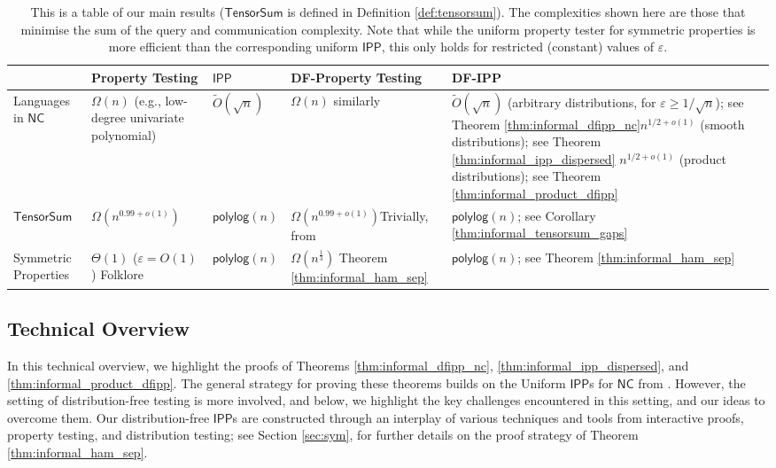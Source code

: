 \documentclass[11pt]{article}
\newcommand{\polylog}{\mathsf{polylog}}
\newcommand{\NC}{\mathsf{NC}}
\newcommand{\IPP}{\mathsf{IPP}}
\newcommand{\TensorSum}{\mathsf{TensorSum}}
\newcommand{\eps}{\varepsilon}
\begin{document}
\begin{table}[!h]
\begin{tabular}{ | m{5em} | m{2.75cm}| m{1.75cm} | m{2.25cm}| m{5.5cm} | } 
  \hline
  & Property \quad Testing & $\IPP$ &  DF-Property Testing & DF-IPP\\
  \hline
  Languages in $\NC$ & $\Omega(n)$ (e.g., low-degree univariate polynomial) & $\tilde{O}(\sqrt{n})$ \newline \cite{RVW,RR20_batch_polylog} & $\Omega(n)$ similarly & $\tilde{O}(\sqrt{n})$ (arbitrary distributions, for $\varepsilon \geq 1/\sqrt{n}$); see Theorem \ref{thm:informal_dfipp_nc}\newline $n^{1/2+o(1)}$ (smooth distributions); see Theorem \ref{thm:informal_ipp_dispersed} \newline $n^{1/2+o(1)}$  (product distributions); see Theorem \ref{thm:informal_product_dfipp}\\ 
  \hline
  $\TensorSum$ & $\Omega(n^{0.99+o(1)})$ \newline \cite{GR18} & $\polylog(n)$  \newline \cite{GR18} & $\Omega(n^{0.99+o(1)})$\newline Trivially, from \cite{GR18} & $\polylog(n)$; see Corollary \ref{thm:informal_tensorsum_gaps} \\ 
  \hline
  Symmetric Properties & $\Theta(1)$ ($\varepsilon=O(1)$) Folklore \newline & $\polylog(n)$ \cite{RVW} & $\Omega(n^{\frac{1}{3}})$ \newline Theorem \ref{thm:informal_ham_sep}& $\polylog(n)$; see Theorem \ref{thm:informal_ham_sep} \\ 
  \hline
\end{tabular}
\caption{
This is a table of our main results ($\TensorSum$ is defined in Definition \ref{def:tensorsum}). The complexities shown here are those that minimise the sum of the query and communication complexity. Note that while the uniform property tester for symmetric properties is more efficient than the corresponding uniform $\IPP$, this only holds for restricted (constant) values of $\eps$.}
\label{tbl:results}
\end{table}

\subsection{Technical Overview}
\label{sec:techniques}
In this technical overview, we highlight the proofs of Theorems \ref{thm:informal_dfipp_nc}, \ref{thm:informal_ipp_dispersed}, and \ref{thm:informal_product_dfipp}. The general strategy for proving these theorems builds on the Uniform $\IPP$s for $\NC$ from \cite{RVW,RR20_batch_polylog}. However, the setting of distribution-free testing is more involved, and below, we highlight the key challenges encountered in this setting, and our ideas to overcome them. Our distribution-free $\IPP$s are constructed through an interplay of various techniques and tools from interactive proofs, property testing, and distribution testing; see Section \ref{sec:sym}, for further details on the proof strategy of Theorem \ref{thm:informal_ham_sep}. 
\end{document}

